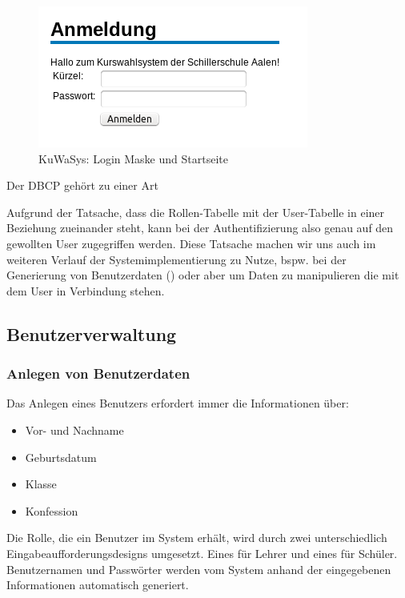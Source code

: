 \begin{figure}
 \begin{center}
   \includegraphics[scale=0.7]{img/login_KuWaSys.png}
 \end{center}
 \caption[\textbf{KuWaSys: Login Maske und Startseite}]{KuWaSys: Login Maske und Startseite}
 \label{fig:login_KuWaSys}
\end{figure}

Der \ac{DBCP} gehört zu einer Art

Aufgrund der Tatsache, dass die Rollen-Tabelle mit der User-Tabelle in einer Beziehung zueinander steht, kann bei der Authentifizierung also genau auf den gewollten User zugegriffen werden. Diese Tatsache machen wir uns auch im weiteren Verlauf der Systemimplementierung zu Nutze, bspw. bei der Generierung von Benutzerdaten () oder aber um Daten zu manipulieren die mit dem User in Verbindung stehen.

\subsection{Benutzerverwaltung}\label{subsec:Daten eines Benutzers}

\subsubsection{Anlegen von Benutzerdaten}

Das Anlegen eines Benutzers erfordert immer die Informationen über:
\begin{itemize}
  \item Vor- und Nachname
  \item Geburtsdatum
  \item Klasse
  \item Konfession
\end{itemize}

Die Rolle, die ein Benutzer im System erhält, wird durch zwei unterschiedlich Eingabeaufforderungsdesigns umgesetzt. Eines für Lehrer und eines für Schüler. Benutzernamen und Passwörter werden vom System anhand der eingegebenen Informationen automatisch generiert. 

